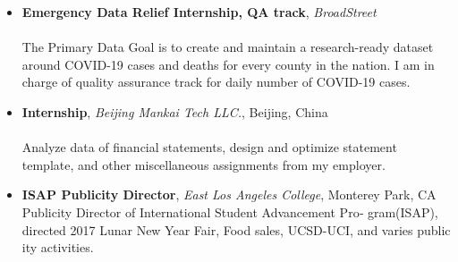 \documentclass{article}
\newcommand{\insertvspace}{%
	\rlap{\color{white}\rule{.4pt}{.7\baselineskip}}%
	\vspace{\baselineskip}}%
\begin{document}
	\insertvspace
	\noindent
	\begin{minipage}[t]{0.5\textwidth}		
		\begin{itemize}[leftmargin=*]
			\item[]
			\textbf{Emergency Data Relief Internship, QA track}, \textit{BroadStreet} \\
			 \\
			The Primary Data Goal is to create and maintain a research-ready dataset around COVID-19 cases and deaths for every county in the nation. I am in charge of quality assurance track for daily number of COVID-19 cases.
			
			\item[] 
			\textbf{Internship}, \textit{Beijing Mankai Tech LLC.}, Beijing, China\\
			 \\
			Analyze data of financial statements, design and optimize statement template, and other miscellaneous assignments from my employer.
		\end{itemize}
	\end{minipage}\hspace{0.3in}  %
	\begin{minipage}[t]{0.45\textwidth}
		\begin{itemize}[leftmargin=*]
			\item[] 
			\textbf{ISAP Publicity Director}, \textit{East Los Angeles College}, Monterey Park, CA \\
			Pub​lic​ity Di​rec​tor of In​ter​na​tional Stu​dent Ad​vance​ment Pro​‐ gram(ISAP), di​rected 2017 Lunar New Year Fair, Food sales, UCSD-UCI, and varies pub​lic​ity ac​tiv​i​ties.
		\end{itemize}
	\end{minipage}

\end{document}
